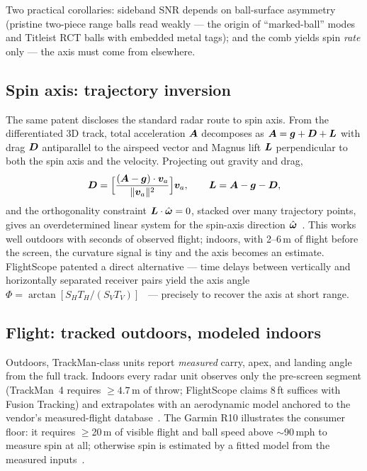 Two practical corollaries: sideband SNR depends on ball-surface asymmetry
(pristine two-piece range balls read weakly --- the origin of
``marked-ball'' modes and Titleist RCT balls with embedded metal tags);
and the comb yields spin \emph{rate} only --- the axis must come from
elsewhere.

\subsection{Spin axis: trajectory inversion}
\label{sec:spinaxis}

The same patent discloses the standard radar route to spin axis. From the
differentiated 3D track, total acceleration $\bm{A}$ decomposes as
$\bm{A} = \bm{g} + \bm{D} + \bm{L}$ with drag $\bm{D}$
antiparallel to the airspeed vector and Magnus lift $\bm{L}$
perpendicular to both the spin axis and the velocity. Projecting out
gravity and drag,
\begin{equation}
\label{eq:liftextract}
\bm{D} = \Bigl[\frac{(\bm{A}-\bm{g})\cdot\bm{v}_a}
  {\lVert\bm{v}_a\rVert^2}\Bigr]\bm{v}_a,
\qquad
\bm{L} = \bm{A} - \bm{g} - \bm{D},
\end{equation}
and the orthogonality constraint $\bm{L}\cdot\hat{\bm{\omega}} = 0$,
stacked over many trajectory points, gives an overdetermined linear system
for the spin-axis direction $\hat{\bm{\omega}}$~\cite{us8845442}. This
works well outdoors with seconds of observed flight; indoors, with
2--6\,m of flight before the screen, the curvature signal is tiny and the
axis becomes an estimate. FlightScope patented a direct alternative ---
time delays between vertically and horizontally separated receiver pairs
yield the axis angle
$\Phi = \arctan[S_H T_H / (S_V T_V)]$~\cite{us10775492} --- precisely to
recover the axis at short range.

\subsection{Flight: tracked outdoors, modeled indoors}

Outdoors, TrackMan-class units report \emph{measured} carry, apex, and
landing angle from the full track. Indoors every radar unit observes only
the pre-screen segment (TrackMan~4 requires $\ge4.7$\,m of throw;
FlightScope claims 8\,ft suffices with Fusion Tracking) and extrapolates
with an aerodynamic model anchored to the vendor's measured-flight
database~\cite{trackmanspecs,homeperformancelab}. The Garmin R10
illustrates the consumer floor: it requires $\ge$20\,m of visible flight
and ball speed above $\sim$90\,mph to measure spin at all; otherwise spin
is estimated by a fitted model from the measured
inputs~\cite{garminr10accuracy}.


